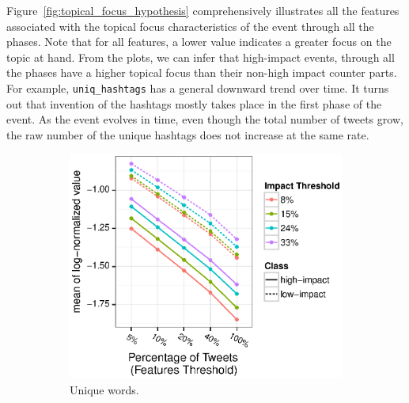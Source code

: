 \documentclass[10pt,letterpaper]{article}
\begin{document}
Figure~\ref{fig:topical_focus_hypothesis} comprehensively illustrates
all the features associated with the topical focus characteristics of
the event through all the phases. Note that for all features, a lower
value indicates a greater focus on the topic at hand. From the plots,
we can infer that high-impact events, through all the phases have a
higher topical focus than their non-high impact counter parts. For example,
\texttt{uniq\_hashtags} has a general downward trend over time. It turns
out that invention of the hashtags mostly takes place in the first
phase of the event. As the event evolves in time, even though the
total number of tweets grow, the raw number of the unique hashtags
does not increase at the same rate.
\label{subsec:topical_focus}
\begin{figure}[h]
  \centering
  \begin{subfigure}[h]{0.45\textwidth}
    \includegraphics[width=\textwidth]{figures_SI/Plots_from_data/total_unique_words.eps}
    \caption{Unique words.} \label{fig:feat_uniq_words}
  \end{subfigure}
  ~ %
  \begin{subfigure}[h]{0.45\textwidth}

\end{subfigure}
\end{figure}
\end{document}
